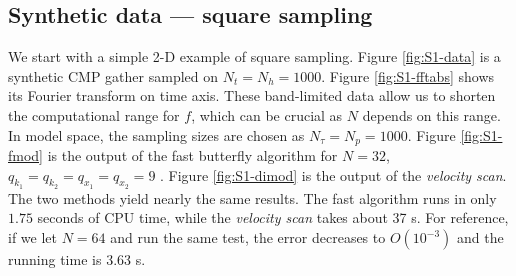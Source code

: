 

\subsection{Synthetic data --- square sampling}

We start with a simple 2-D example of square sampling. Figure \ref{fig:S1-data} is a synthetic CMP gather sampled on $N_t=N_h=1000$. Figure \ref{fig:S1-fftabs} shows  its Fourier transform  on time axis. These band-limited data allow us to shorten the computational range for $f$, which can be crucial as $N$ depends on this range. In model space, the sampling sizes are chosen as $N_{\tau}=N_p=1000$. Figure \ref{fig:S1-fmod} is the output of the fast butterfly algorithm for $N=32$, $q_{k_1}=q_{k_2}=q_{x_1}=q_{x_2}=9$ . Figure \ref{fig:S1-dimod} is the output of the {\it velocity scan}. The two methods yield nearly the same results. The fast algorithm runs in only $1.75$ seconds of CPU time, while the {\it velocity scan} takes about 37 s.  For reference, if we let $N=64$ and run the same test, the error decreases to $O(10^{-3})$ and the running time is 3.63 s.





